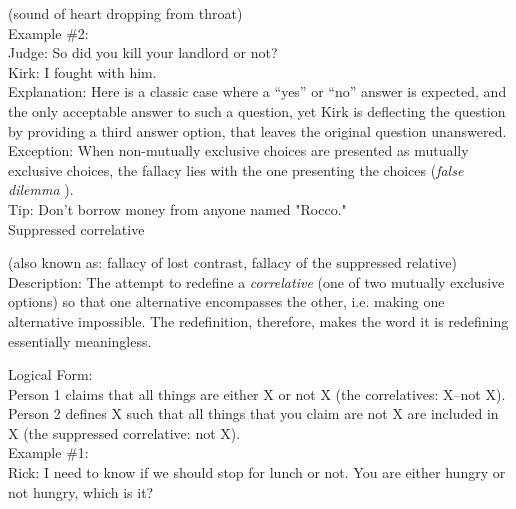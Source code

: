 \documentclass[a4paper,12pt,single,pdftex]{scrartcl}
\begin{document}
    
      (sound of heart dropping from throat)
    \\

    
      Example \#2:
    \\

    
      Judge: So did you kill your landlord or not?
    \\

    
      Kirk: I fought with him.
    \\

    
      Explanation: Here is a classic case where a “yes” or “no” answer is expected, and the only acceptable answer to such a question, yet Kirk is deflecting the question by providing a third answer option, that leaves the original question unanswered.
    \\

    
      Exception: When non-mutually exclusive choices are presented as mutually exclusive choices, the fallacy lies with the one presenting the choices ({\it false dilemma} ).
    \\

    
      Tip: Don’t borrow money from anyone named "Rocco."
    \\

  

Suppressed correlative
    
      (also known as: fallacy of lost contrast, fallacy of the suppressed relative)
    \\

  
    Description: The attempt to redefine a {\it correlative} (one of two mutually exclusive options) so that one alternative encompasses the other, i.e. making one alternative impossible. The redefinition, therefore, makes the word it is redefining essentially meaningless.

    
      Logical Form:
    \\

    
      Person 1 claims that all things are either X or not X (the correlatives: X–not X).
    \\

    
      Person 2 defines X such that all things that you claim are not X are included in X (the suppressed correlative: not X).
    \\

    
      Example \#1:
    \\

    
      Rick: I need to know if we should stop for lunch or not.  You are either hungry or not hungry, which is it?
    \\
\end{document}
